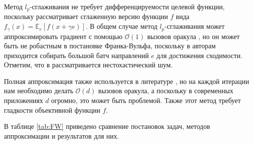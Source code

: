     Метод $l_p$-сглаживания не требует дифференцируемости целевой функции, поскольку рассматривает сглаженную версию функции $f$ вида $f_\gamma (x) = \mathbb{E}_e \left[ f(x + \gamma e) \right]$. В общем случае метод $l_p$-сглаживания может аппроксимировать градиент с помощью $\mathcal{O}(1)$ вызовов оракула \cite{dvinskikh2022noisy}, но он может быть не робастным в постановке Франка-Вульфа, поскольку в \cite{lobanov2023zero} авторам приходится собирать большой батч направлений $e$ для достижения сходимости. Отметим, что в \cite{lobanov2023zero} рассматривается нестохастический шум.

    Полная аппроксимация также используется в литературе \cite{sahu2019towards, gao2020can, akhtar2022zeroth}, но на каждой итерации нам необходимо делать $\mathcal{O}(d)$ вызовов оракула, а поскольку в современных приложениях $d$ огромно, это может быть проблемой. Также этот метод требует гладкости объективной функции $f$.

    В таблице \ref{tab:FW} приведено сравнение постановок задач, методов аппроксимации и результатов для них.
    
